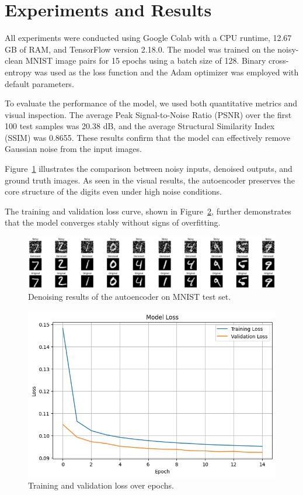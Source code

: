 \section{Experiments and Results}

All experiments were conducted using Google Colab with a CPU runtime, 12.67 GB of RAM, and TensorFlow version 2.18.0. The model was trained on the noisy-clean MNIST image pairs for 15 epochs using a batch size of 128. Binary cross-entropy was used as the loss function and the Adam optimizer was employed with default parameters.

To evaluate the performance of the model, we used both quantitative metrics and visual inspection. The average Peak Signal-to-Noise Ratio (PSNR) over the first 100 test samples was 20.38 dB, and the average Structural Similarity Index (SSIM) was 0.8655. These results confirm that the model can effectively remove Gaussian noise from the input images.

Figure~\ref{fig:denoising_results} illustrates the comparison between noisy inputs, denoised outputs, and ground truth images. As seen in the visual results, the autoencoder preserves the core structure of the digits even under high noise conditions.

The training and validation loss curve, shown in Figure~\ref{fig:loss_curve}, further demonstrates that the model converges stably without signs of overfitting.

\begin{figure}[t]
  \centering
  \includegraphics[width=\linewidth]{figures/denoised_examples.png}
  \caption{Denoising results of the autoencoder on MNIST test set.}
  \label{fig:denoising_results}
\end{figure}

\vspace{0.5cm}

\begin{figure}[t]
  \centering
  \includegraphics[width=0.8\linewidth]{figures/loss_curve.png}
  \caption{Training and validation loss over epochs.}
  \label{fig:loss_curve}
\end{figure}